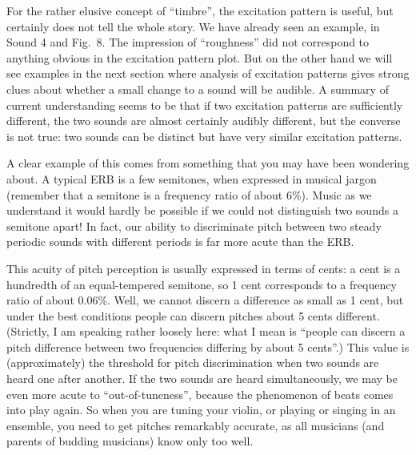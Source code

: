   For the rather elusive concept of ``timbre'', the excitation pattern is 
  useful, but certainly does not tell the whole story. We have already seen an 
  example, in Sound 4 and Fig.\ 8. The impression of ``roughness'' did not 
  correspond to anything obvious in the excitation pattern plot. But on the 
  other hand we will see examples in the next section where analysis of 
  excitation patterns gives strong clues about whether a small change to a 
  sound will be audible. A summary of current understanding seems to be that if 
  two excitation patterns are sufficiently different, the two sounds are almost 
  certainly audibly different, but the converse is not true: two sounds can be 
  distinct but have very similar excitation patterns. 

  A clear example of this comes from something that you may have been wondering 
  about. A typical ERB is a few semitones, when expressed in musical jargon 
  (remember that a semitone is a frequency ratio of about 6\%). Music as we 
  understand it would hardly be possible if we could not distinguish two sounds 
  a semitone apart! In fact, our ability to discriminate pitch between two 
  steady periodic sounds with different periods is far more acute than the ERB. 

  This acuity of pitch perception is usually expressed in terms of cents: a 
  cent is a hundredth of an equal-tempered semitone, so 1 cent corresponds to a 
  frequency ratio of about 0.06\%. Well, we cannot discern a difference as 
  small as 1 cent, but under the best conditions people can discern pitches 
  about 5 cents different. (Strictly, I am speaking rather loosely here: what I 
  mean is ``people can discern a pitch difference between two frequencies 
  differing by about 5 cents''.) This value is (approximately) the threshold 
  for pitch discrimination when two sounds are heard one after another. If the 
  two sounds are heard simultaneously, we may be even more acute to 
  ``out-of-tuneness'', because the phenomenon of beats comes into play again. 
  So when you are tuning your violin, or playing or singing in an ensemble, you 
  need to get pitches remarkably accurate, as all musicians (and parents of 
  budding musicians) know only too well. 

